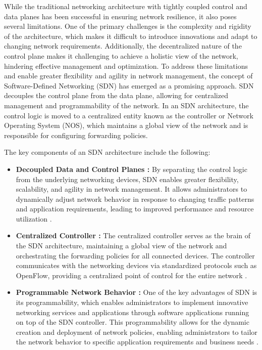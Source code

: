While the traditional networking architecture with tightly coupled control and data planes has been successful in ensuring network resilience, it also poses several limitations. One of the primary challenges is the complexity and rigidity of the architecture, which makes it difficult to introduce innovations and adapt to changing network requirements. Additionally, the decentralized nature of the control plane makes it challenging to achieve a holistic view of the network, hindering effective management and optimization.
To address these limitations and enable greater flexibility and agility in network management, the concept of Software-Defined Networking (SDN) has emerged as a promising approach. SDN decouples the control plane from the data plane, allowing for centralized management and programmability of the network. In an SDN architecture, the control logic is moved to a centralized entity known as the controller or Network Operating System (NOS), which maintains a global view of the network and is responsible for configuring forwarding policies.

The key components of an SDN architecture include the following:

\begin{itemize}

\item \textbf{Decoupled Data and Control Planes :} By separating the control logic from the underlying networking devices, SDN enables greater flexibility, scalability, and agility in network management. It allows administrators to dynamically adjust network behavior in response to changing traffic patterns and application requirements, leading to improved performance and resource utilization \cite{tr2016sdn, kreutz2014software}.

\item \textbf{Centralized Controller :} The centralized controller serves as the brain of the SDN architecture, maintaining a global view of the network and orchestrating the forwarding policies for all connected devices. The controller communicates with the networking devices via standardized protocols such as OpenFlow, providing a centralized point of control for the entire network \cite{tr2016sdn, kreutz2014software}.

\item \textbf{Programmable Network Behavior :} One of the key advantages of SDN is its programmability, which enables administrators to implement innovative networking services and applications through software applications running on top of the SDN controller. This programmability allows for the dynamic creation and deployment of network policies, enabling administrators to tailor the network behavior to specific application requirements and business needs \cite{tr2016sdn, kreutz2014software}.

\end{itemize}




